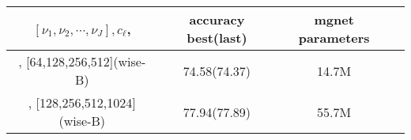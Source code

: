 \begin{enumerate}
\begin{table}[!htbp]
	\begin{center}
			\begin{tabular}{|c|c|c|c|}
				\hline
				$[\nu_1,\nu_2,\cdots,\nu_J], c_\ell$,  &  accuracy  best(last) & mgnet parameters \tabularnewline
                \hline
				[2,2,4,2], [64,128,256,512](wise-B)    &  74.58(74.37)         & 14.7M             \tabularnewline
                \hline
				[2,2,4,2], [128,256,512,1024](wise-B)  &  77.94(77.89)         & 55.7M             \tabularnewline
				\hline
			\end{tabular}
	\end{center}
\end{table}
\end{enumerate}




\newpage
